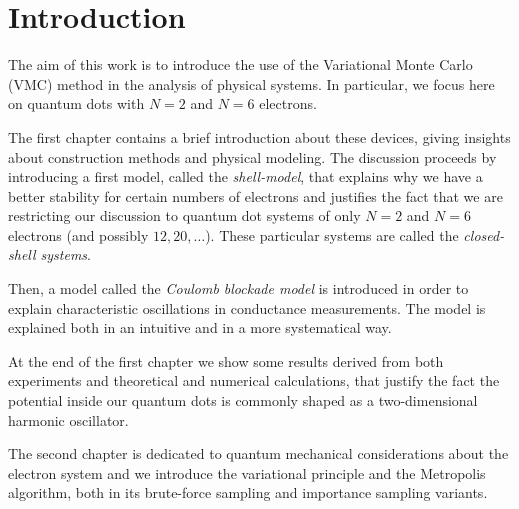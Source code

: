 
\chapter{Introduction}

The aim of this work is to introduce the use of the Variational Monte Carlo (VMC) method in the analysis of physical systems. In particular, we focus here on quantum dots with $N = 2$ and $N = 6$ electrons.

The first chapter contains a brief introduction about these devices, giving insights about construction methods and physical modeling. The discussion proceeds by introducing a first model, called the \emph{shell-model}, that explains why we have a better stability for certain numbers of electrons and justifies the fact that we are restricting our discussion to quantum dot systems of only $N = 2$ and $N = 6$ electrons (and possibly $12, 20, \ldots$). These particular systems are called the \emph{closed-shell systems}.

Then, a model called the \emph{Coulomb blockade model} is introduced in order to explain characteristic oscillations in conductance measurements. The model is explained both in an intuitive and in a more systematical way.

At the end of the first chapter we show some results derived from both experiments and theoretical and numerical calculations, that justify the fact the potential inside our quantum dots is commonly shaped as a two-dimensional harmonic oscillator.

The second chapter is dedicated to quantum mechanical considerations about the electron system and we introduce the variational principle and the Metropolis algorithm, both in its brute-force sampling and importance sampling variants. 

